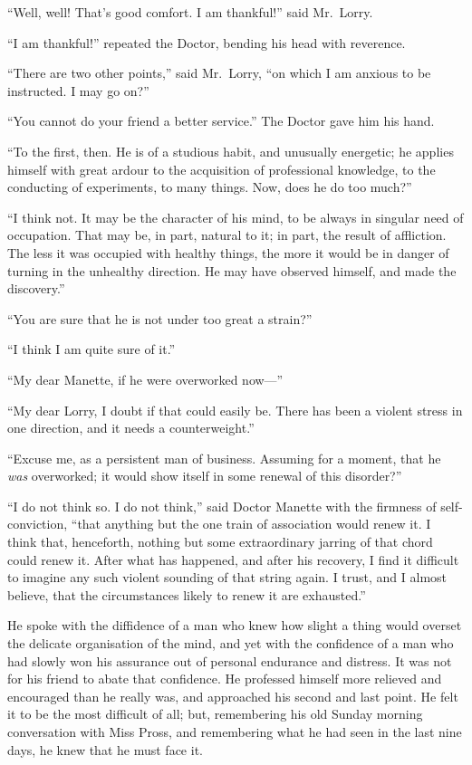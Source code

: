 ``Well, well!  That's good comfort.  I am thankful!'' said Mr.\ Lorry.

``I am thankful!'' repeated the Doctor, bending his head with reverence.

``There are two other points,'' said Mr.\ Lorry, ``on which I am anxious
to be instructed.  I may go on?''

``You cannot do your friend a better service.''  The Doctor gave him
his hand.

``To the first, then.  He is of a studious habit, and unusually
energetic; he applies himself with great ardour to the acquisition
of professional knowledge, to the conducting of experiments, to
many things.  Now, does he do too much?''

``I think not.  It may be the character of his mind, to be always in
singular need of occupation.  That may be, in part, natural to it; in
part, the result of affliction.  The less it was occupied with healthy
things, the more it would be in danger of turning in the unhealthy
direction.  He may have observed himself, and made the discovery.''

``You are sure that he is not under too great a strain?''

``I think I am quite sure of it.''

``My dear Manette, if he were overworked now---''

``My dear Lorry, I doubt if that could easily be.  There has been a
violent stress in one direction, and it needs a counterweight.''

``Excuse me, as a persistent man of business.  Assuming for a moment,
that he \emph{was} overworked; it would show itself in some renewal of this disorder?''

``I do not think so.  I do not think,'' said Doctor Manette with the
firmness of self-conviction, ``that anything but the one train of
association would renew it.  I think that, henceforth, nothing but
some extraordinary jarring of that chord could renew it.  After what
has happened, and after his recovery, I find it difficult to imagine
any such violent sounding of that string again.  I trust, and I almost
believe, that the circumstances likely to renew it are exhausted.''

He spoke with the diffidence of a man who knew how slight a thing
would overset the delicate organisation of the mind, and yet with the
confidence of a man who had slowly won his assurance out of personal
endurance and distress.  It was not for his friend to abate that
confidence.  He professed himself more relieved and encouraged than he
really was, and approached his second and last point.  He felt it to
be the most difficult of all; but, remembering his old Sunday morning
conversation with Miss Pross, and remembering what he had seen in the
last nine days, he knew that he must face it.

